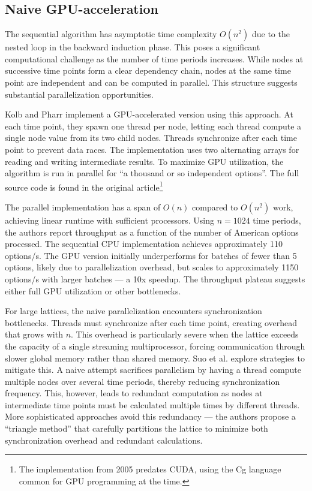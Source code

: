 \documentclass[english,12pt,a4paper,pdftex,sci,utf8]{aaltothesis}
\begin{document}
\subsection{Naive GPU-acceleration}
The sequential algorithm has asymptotic time complexity $O(n^2)$ due to the nested loop in the backward induction phase. This poses a significant computational challenge as the number of time periods increases. While nodes at successive time points form a clear dependency chain, nodes at the same time point are independent and can be computed in parallel. This structure suggests substantial parallelization opportunities.

Kolb and Pharr \cite{pharr2005gpu} implement a GPU-accelerated version using this approach. At each time point, they spawn one thread per node, letting each thread compute a single node value from its two child nodes. Threads synchronize after each time point to prevent data races. The implementation uses two alternating arrays for reading and writing intermediate results. To maximize GPU utilization, the algorithm is run in parallel for ``a thousand or so independent options''. The full source code is found in the original article\footnote{The implementation from 2005 predates CUDA, using the Cg language common for GPU programming at the time.}

The parallel implementation has a span of $O(n)$ compared to $O(n^2)$ work, achieving linear runtime with sufficient processors. Using $n=1024$ time periods, the authors report throughput as a function of the number of American options processed. The sequential CPU implementation achieves approximately 110 options/s. The GPU version initially underperforms for batches of fewer than 5 options, likely due to parallelization overhead, but scales to approximately 1150 options/s with larger batches --- a 10x speedup. The throughput plateau suggests either full GPU utilization or other bottlenecks.

For large lattices, the naive parallelization encounters synchronization bottlenecks. Threads must synchronize after each time point, creating overhead that grows with $n$. This overhead is particularly severe when the lattice exceeds the capacity of a single streaming multiprocessor, forcing communication through slower global memory rather than shared memory. Suo et al. \cite{suo2015gpu} explore strategies to mitigate this. A naive attempt sacrifices parallelism by having a thread compute multiple nodes over several time periods, thereby reducing synchronization frequency. This, however, leads to redundant computation as nodes at intermediate time points must be calculated multiple times by different threads. More sophisticated approaches avoid this redundancy --- the authors propose a ``triangle method'' that carefully partitions the lattice to minimize both synchronization overhead and redundant calculations.
\clearpage
\end{document}
